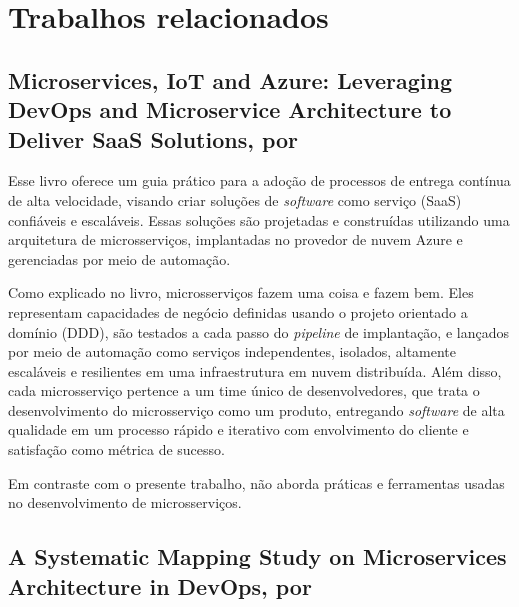 \chapter{Trabalhos relacionados}\label{chapter-trabalhos-relacionados}


\section{Microservices, IoT and Azure: Leveraging DevOps and Microservice Architecture to Deliver SaaS Solutions, por \texorpdfstring{}{Familiar (2015)}}

Esse livro oferece um guia prático para a adoção de processos de entrega contínua de alta velocidade, visando criar soluções de \emph{software} como serviço (SaaS) confiáveis e escaláveis. Essas soluções são projetadas e construídas utilizando uma arquitetura de microsserviços, implantadas no provedor de nuvem Azure e gerenciadas por meio de automação.

Como explicado no livro, microsserviços fazem uma coisa e fazem bem. Eles representam capacidades de negócio definidas usando o projeto orientado a domínio (DDD), são testados a cada passo do \emph{pipeline} de implantação, e lançados por meio de automação como serviços independentes, isolados, altamente escaláveis e resilientes em uma infraestrutura em nuvem distribuída. Além disso, cada microsserviço pertence a um time único de desenvolvedores, que trata o desenvolvimento do microsserviço como um produto, entregando \emph{software} de alta qualidade em um processo rápido e iterativo com envolvimento do cliente e satisfação como métrica de sucesso.

Em contraste com o presente trabalho,  não aborda práticas e ferramentas usadas no desenvolvimento de microsserviços.

\section{A Systematic Mapping Study on Microservices Architecture in DevOps, por \texorpdfstring{}{Waseem, Liang e Shahin (2020)} }

